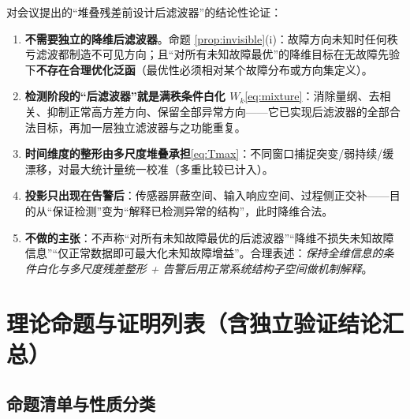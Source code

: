 \documentclass[11pt,a4paper]{ctexart}
\theoremstyle{remark}
\begin{document}
对会议提出的“堆叠残差前设计后滤波器”的结论性论证：

\begin{enumerate}
\item \textbf{不需要独立的降维后滤波器}。命题 \ref{prop:invisible}(i)：故障方向未知时任何秩亏滤波都制造不可见方向；且“对所有未知故障最优”的降维目标在无故障先验下\textbf{不存在合理优化泛函}（最优性必须相对某个故障分布或方向集定义）。
\item \textbf{检测阶段的“后滤波器”就是满秩条件白化 $W_k$}\eqref{eq:mixture}：消除量纲、去相关、抑制正常高方差方向、保留全部异常方向——它已实现后滤波器的全部合法目标，再加一层独立滤波器与之功能重复。
\item \textbf{时间维度的整形由多尺度堆叠承担}\eqref{eq:Tmax}：不同窗口捕捉突变/弱持续/缓漂移，对最大统计量统一校准（多重比较已计入）。
\item \textbf{投影只出现在告警后}：传感器屏蔽空间、输入响应空间、过程侧正交补——目的从“保证检测”变为“解释已检测异常的结构”，此时降维合法。
\item \textbf{不做的主张}：不声称“对所有未知故障最优的后滤波器”“降维不损失未知故障信息”“仅正常数据即可最大化未知故障增益”。合理表述：\textit{保持全维信息的条件白化与多尺度残差整形 + 告警后用正常系统结构子空间做机制解释}。
\end{enumerate}

\section{理论命题与证明列表（含独立验证结论汇总）}

\subsection{命题清单与性质分类}
\end{document}
